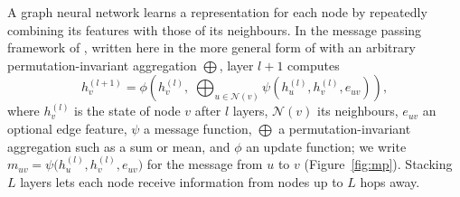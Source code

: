 A graph neural network learns a representation for each node by repeatedly combining its features
with those of its neighbours. In the message passing framework of \citet{gilmer2017mpnn}, written
here in the more general form of \citet{bronstein2021geometric} with an arbitrary
permutation-invariant aggregation $\bigoplus$, layer $l+1$ computes
\begin{equation}
h_v^{(l+1)} = \phi\!\left( h_v^{(l)},\; \bigoplus_{u \in \mathcal{N}(v)} \psi\!\left( h_u^{(l)}, h_v^{(l)}, e_{uv} \right) \right),
\label{eq:mp}
\end{equation}
where $h_v^{(l)}$ is the state of node $v$ after $l$ layers, $\mathcal{N}(v)$ its neighbours,
$e_{uv}$ an optional edge feature, $\psi$ a message function, $\bigoplus$ a permutation-invariant
aggregation such as a sum or mean, and $\phi$ an update function; we write
$m_{uv} = \psi\big(h_u^{(l)}, h_v^{(l)}, e_{uv}\big)$ for the message from $u$ to $v$
(Figure~\ref{fig:mp}). Stacking $L$ layers lets each node receive information from nodes up to $L$
hops away.

